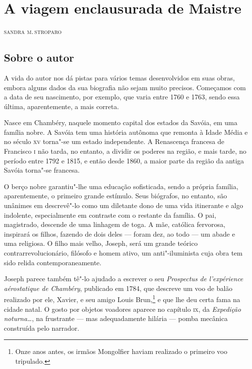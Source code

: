 \chapter{A viagem enclausurada de Maistre}

\begin{flushright}
\textsc{sandra m.\,stroparo}
\end{flushright}\medskip

\section{Sobre o autor}

\noindent{}A vida do autor nos dá pistas para vários temas desenvolvidos em suas
obras, embora alguns dados da sua biografia não sejam muito precisos.
Começamos com a data de seu nascimento, por exemplo, que varia entre
1760 e 1763, sendo essa última, aparentemente, a mais correta. 

Nasce em Chambéry, naquele momento capital dos estados da Savóia, em uma
família nobre. A Savóia tem uma história autônoma que remonta à Idade
Média e no século \textsc{xv} torna"-se um estado independente. A Renascença
francesa de Francisco \textsc{i} não tarda, no entanto, a dividir os poderes na
região, e mais tarde, no período entre 1792 e 1815, e então desde 1860,
a maior parte da região da antiga Savóia torna"-se francesa. 

O berço nobre garantiu"-lhe uma educação sofisticada, sendo a própria
família, aparentemente, o primeiro grande estímulo. Seus biógrafos, no
entanto, são unânimes em descrevê"-lo como um diletante dono de uma
vida itinerante e algo indolente, especialmente em contraste com o
restante da família. O pai, magistrado, descende de uma linhagem de
toga. A mãe, católica fervorosa, inspirará os filhos, fazendo de dois
deles --- foram dez, ao todo --- um abade e uma religiosa. O filho mais
velho, Joseph, será um grande teórico contrarrevolucionário, filósofo e
homem ativo,  um anti"-iluminista cuja obra tem sido relida
contemporaneamente. 

 Joseph parece também tê"-lo ajudado a escrever o seu \textit{Prospectus
de l’expérience aérostatique de Chambéry}, publicado em 1784, que
descreve um voo de balão realizado por ele, Xavier, e seu amigo Louis
Brun,\footnote{ Onze anos antes, os irmãos Mongolfier haviam realizado o
primeiro voo tripulado.} e que lhe deu certa fama na cidade natal. O
gosto por objetos voadores aparece no capítulo \textsc{ix}, da \textit{Expedição
noturna\ldots}, na frustrante --- mas adequadamente hilária --- pomba mecânica
construída pelo narrador. 


